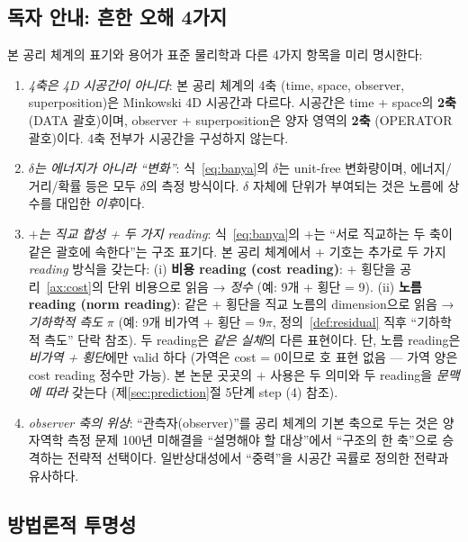 \documentclass[entropy,article,submit,pdftex,oneauthor]{Definitions/mdpi}
\begin{document}
\subsection{독자 안내: 흔한 오해 4가지}

본 공리 체계의 표기와 용어가 표준 물리학과 다른 4가지 항목을 미리 명시한다:
\begin{enumerate}
\item \emph{4축은 4D 시공간이 아니다}: 본 공리 체계의 4축 (time, space, observer, superposition)은 Minkowski 4D 시공간과 다르다. 시공간은 time + space의 \textbf{2축} (DATA 괄호)이며, observer + superposition은 양자 영역의 \textbf{2축} (OPERATOR 괄호)이다. 4축 전부가 시공간을 구성하지 않는다.
\item \emph{$\delta$는 에너지가 아니라 ``변화''}: 식~\eqref{eq:banya}의 $\delta$는 unit-free 변화량이며, 에너지/거리/확률 등은 모두 $\delta$의 측정 방식이다. $\delta$ 자체에 단위가 부여되는 것은 노름에 상수를 대입한 \emph{이후}이다.
\item \emph{$+$는 직교 합성 + 두 가지 reading}: 식~\eqref{eq:banya}의 $+$는 ``서로 직교하는 두 축이 같은 괄호에 속한다''는 구조 표기다. 본 공리 체계에서 $+$ 기호는 추가로 두 가지 \emph{reading} 방식을 갖는다: (i) \textbf{비용 reading (cost reading)}: $+$ 횡단을 공리~\ref{ax:cost}의 단위 비용으로 읽음 → \emph{정수} (예: 9개 + 횡단 = 9). (ii) \textbf{노름 reading (norm reading)}: 같은 + 횡단을 직교 노름의 dimension으로 읽음 → \emph{기하학적 측도} $\pi$ (예: 9개 비가역 + 횡단 = $9\pi$, 정의~\ref{def:residual} 직후 ``기하학적 측도'' 단락 참조).
두 reading은 \emph{같은 실체}의 다른 표현이다. 단, 노름 reading은 \emph{비가역 + 횡단}에만 valid 하다 (가역은 cost = 0이므로 호 표현 없음 — 가역 양은 cost reading 정수만 가능). 본 논문 곳곳의 $+$ 사용은 두 의미와 두 reading을 \emph{문맥에 따라} 갖는다 (제\ref{sec:prediction}절 5단계 step (4) 참조).
\item \emph{observer 축의 위상}: ``관측자(observer)''를 공리 체계의 기본 축으로 두는 것은 양자역학 측정 문제 100년 미해결을 ``설명해야 할 대상''에서 ``구조의 한 축''으로 승격하는 전략적 선택이다. 일반상대성에서 ``중력''을 시공간 곡률로 정의한 전략과 유사하다.
\end{enumerate}


\subsection{방법론적 투명성}
\label{sec:transparency}
\end{document}

